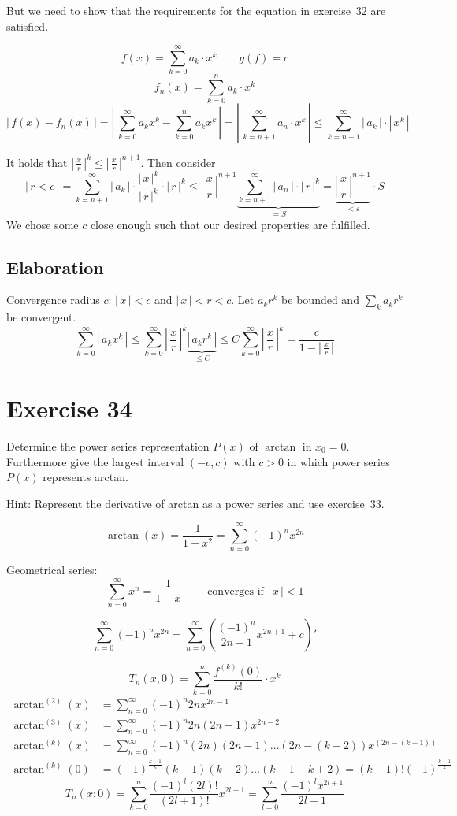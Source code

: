 \documentclass[a4paper]{article}
\theoremstyle{definition}
\newcommand\abs[1]{\left|\,#1\,\right|}
\begin{document}
But we need to show that the requirements for the equation in exercise~32 are satisfied.

\[ f(x) = \sum_{k=0}^\infty a_k \cdot x^k \qquad g(f) = c \]
\[ f_n(x) = \sum_{k=0}^n a_k \cdot x^k \]
\[ \abs{f(x) - f_n(x)} = \abs{\sum_{k=0}^\infty a_k x^k - \sum_{k=0}^n a_k x^k} = \abs{\sum_{k=n+1}^\infty a_n \cdot x^k} \leq \sum_{k=n+1}^\infty \abs{a_k} \cdot \abs{x^k} \]

It holds that $\abs{\frac{x}{r}}^k \leq \abs{\frac{x}{r}}^{n+1}$. Then consider
\[ \abs{r < c} = \sum_{k=n+1}^\infty \abs{a_k} \cdot \frac{\abs{x}^k}{\abs{r}^k} \cdot \abs{r}^k \leq \abs{\frac{x}{r}}^{n+1} \underbrace{\sum_{k=n+1}^\infty \abs{a_n} \cdot \abs{r}^k}_{=S} = \underbrace{\abs{\frac{x}{r}}^{n+1}}_{<\varepsilon} \cdot S \]
We chose some $c$ close enough such that our desired properties are fulfilled.

\subsection{Elaboration}
Convergence radius $c$: $\abs{x} < c$ and $\abs{x} < r < c$.
Let $a_k r^k$ be bounded and $\sum_{k} a_k r^k$ be convergent.
\[ \sum_{k=0}^\infty \abs{a_k x^k} \leq \sum_{k=0}^\infty \abs{\frac{x}{r}}^k \underbrace{\abs{a_k r^k}}_{\leq C} \leq C \sum_{k=0}^\infty \abs{\frac{x}{r}}^k = \frac{c}{1 - \abs{\frac{x}{r}}} \]

\section{Exercise 34}
\begin{ex}
  Determine the power series representation $P(x)$ of $\arctan$ in $x_0 = 0$.
  Furthermore give the largest interval $(-c, c)$ with $c > 0$ in which power
  series $P(x)$ represents arctan.

  Hint: Represent the derivative of arctan as a power series and use exercise~33.
\end{ex}

\[ \arctan(x) = \frac{1}{1 + x^2} = \sum_{n=0}^\infty (-1)^n x^{2n} \]

Geometrical series:
\[ \sum_{n=0}^\infty x^n = \frac{1}{1 - x} \qquad \text{ converges if } \abs{x} < 1 \]

\[ \sum_{n=0}^\infty (-1)^n x^{2n} = \sum_{n=0}^\infty \left(\frac{(-1)^n}{2n + 1} x^{2n+1} + c\right)' \]

\[ T_n(x,0) = \sum_{k=0}^n \frac{f^{(k)}(0)}{k!} \cdot x^k \]
\begin{align*}
  \arctan^{(2)}(x) &= \sum_{n=0}^\infty (-1)^n 2n x^{2n-1} \\
  \arctan^{(3)}(x) &= \sum_{n=0}^\infty (-1)^n 2n (2n - 1) x^{2n-2} \\
  \arctan^{(k)}(x) &= \sum_{n=0}^\infty (-1)^n (2n) (2n - 1) \ldots (2n - (k-2)) x^{(2n - (k-1))} \\
  \arctan^{(k)}(0) &= (-1)^{\frac{k-1}{k}} (k-1)(k-2) \ldots (k-1-k+2) = (k-1)! (-1)^{\frac{k-1}{2}}
\end{align*}
\[ T_n(x;0) = \sum_{k=0}^n \frac{(-1)^l (2l)!}{(2l + 1)!} x^{2l+1} = \sum_{l=0}^n \frac{(-1)^l x^{2l+1}}{2l + 1} \]
\end{document}
